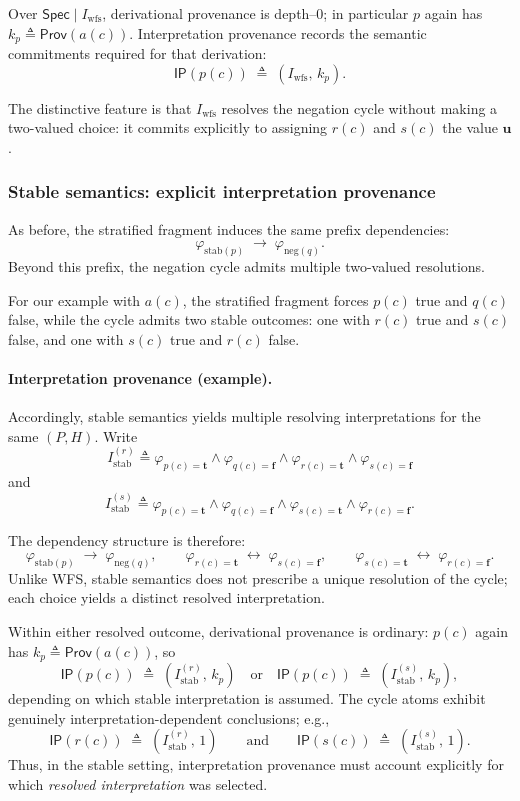 \documentclass[acmsmall,nonacm]{acmart}
\theoremstyle{remark}
\numberwithin{definition}{section}
\numberwithin{theorem}{section}
\numberwithin{lemma}{section}
\numberwithin{corollary}{section}
\numberwithin{remark}{section}
\numberwithin{example}{section}
\numberwithin{observation}{section}
\numberwithin{assumption}{section}
\newcommand{\Spec}{\mathsf{Spec}}
\newcommand{\Prov}{\mathsf{Prov}}
\begin{document}
Over $\Spec \mid I_{\mathrm{wfs}}$, derivational provenance is depth--0; in
particular $p$ again has
$k_p \triangleq \Prov(a(c))$.
Interpretation provenance records the semantic commitments required for that
derivation:
\[
  \mathsf{IP}(p(c)) \;\triangleq\; (I_{\mathrm{wfs}},\, k_p) .
\]

The distinctive feature is that $I_{\mathrm{wfs}}$ resolves the negation cycle
without making a two-valued choice: it commits explicitly to assigning $r(c)$ and $s(c)$
the value $\mathbf{u}$.

\subsubsection{Stable semantics: explicit interpretation provenance}

As before, the stratified fragment induces the same prefix dependencies:
\[
  \varphi_{\mathrm{stab}(p)} \;\rightarrow\; \varphi_{\mathrm{neg}(q)}.
\]
Beyond this prefix, the negation cycle admits multiple two-valued resolutions.

For our example with $a(c)$, the stratified fragment forces $p(c)$ true and $q(c)$ false,
while the cycle admits two stable outcomes: one with $r(c)$ true and $s(c)$ false, and
one with $s(c)$ true and $r(c)$ false.

\paragraph{Interpretation provenance (example).}
Accordingly, stable semantics yields multiple resolving interpretations for the
same $(P,H)$.
Write
\[
  I_{\mathrm{stab}}^{(r)} \triangleq
  \varphi_{p(c)=\mathbf{t}} \wedge \varphi_{q(c)=\mathbf{f}}
  \wedge \varphi_{r(c)=\mathbf{t}} \wedge \varphi_{s(c)=\mathbf{f}}
\]
and
\[
  I_{\mathrm{stab}}^{(s)} \triangleq
  \varphi_{p(c)=\mathbf{t}} \wedge \varphi_{q(c)=\mathbf{f}}
  \wedge \varphi_{s(c)=\mathbf{t}} \wedge \varphi_{r(c)=\mathbf{f}} .
\]

The dependency structure is therefore:
\[
  \varphi_{\mathrm{stab}(p)} \;\rightarrow\; \varphi_{\mathrm{neg}(q)},
  \qquad
  \varphi_{r(c)=\mathbf{t}} \;\leftrightarrow\; \varphi_{s(c)=\mathbf{f}},
  \qquad
  \varphi_{s(c)=\mathbf{t}} \;\leftrightarrow\; \varphi_{r(c)=\mathbf{f}} .
\]
Unlike WFS, stable semantics does not prescribe a unique resolution of the cycle;
each choice yields a distinct resolved interpretation.

Within either resolved outcome, derivational provenance is ordinary:
$p(c)$ again has $k_p \triangleq \Prov(a(c))$, so
\[
  \mathsf{IP}(p(c)) \;\triangleq\; (I_{\mathrm{stab}}^{(r)},\, k_p)
  \quad\text{or}\quad
  \mathsf{IP}(p(c)) \;\triangleq\; (I_{\mathrm{stab}}^{(s)},\, k_p) ,
\]
depending on which stable interpretation is assumed.
The cycle atoms exhibit genuinely interpretation-dependent conclusions; e.g.,
\[
  \mathsf{IP}(r(c)) \;\triangleq\; (I_{\mathrm{stab}}^{(r)},\, 1)
  \qquad\text{and}\qquad
  \mathsf{IP}(s(c)) \;\triangleq\; (I_{\mathrm{stab}}^{(s)},\, 1) .
\]
Thus, in the stable setting, interpretation provenance must account explicitly for
which \emph{resolved interpretation} was selected.
\end{document}
